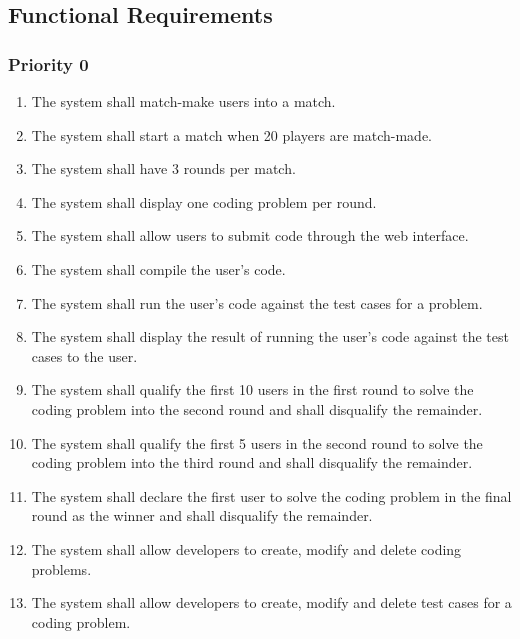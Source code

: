 \documentclass[12pt, titlepage]{article}
\begin{document}
\subsection{Functional Requirements}
\subsubsection{Priority 0}
\begin{enumerate}[label=FR.\arabic*]
    \item The system shall match-make users into a match. \label{FR.1}
    \item The system shall start a match when 20 players are match-made. \label{FR.2}
    \item The system shall have 3 rounds per match. \label{FR.3}
    \item The system shall display one coding problem per round. \label{FR.4}
    \item The system shall allow users to submit code through the web interface. \label{FR.5}
    \item The system shall compile the user's code. \label{FR.6}
    \item The system shall run the user's code against the test cases for a problem.  \label{FR.7}
    \item The system shall display the result of running the user's code against the test cases to the user.  \label{FR.8}
    \item The system shall qualify the first 10 users in the first round to solve the coding problem into the second round and shall disqualify the remainder.  \label{FR.9}
    \item The system shall qualify the first 5 users in the second round to solve the coding problem into the third round and shall disqualify the remainder.  \label{FR.10}
    \item The system shall declare the first user to solve the coding problem in the final round as the winner and shall disqualify the remainder.  \label{FR.11}
    \item The system shall allow developers to create, modify and delete coding problems.  \label{FR.12}
    \item The system shall allow developers to create, modify and delete test cases for a coding problem.  \label{FR.13}

\end{enumerate}
\end{document}

